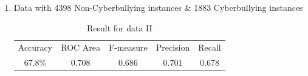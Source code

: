 \documentclass[10pt,conference]{IEEEtran}
\begin{document}
\begin{enumerate}
\begin{enumerate}
    \item Data with 4398 Non-Cyberbullying instances \& 1883 Cyberbullying instances
    \begin{table}[htbp]
    \caption{Result for data II}
        \centering
        \begin{tabular}{c|c|c|c|c}
            Accuracy & ROC Area & F-measure & Precision & Recall \\
            67.8\% & 0.708 & 0.686 & 0.701 & 0.678 \\
        \end{tabular}
        \label{tab:my_label}
    \end{table}
\end{enumerate}

\end{enumerate}
\end{document}
